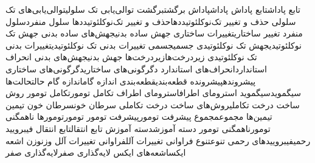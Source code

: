 {تابع پاداش}{تابع پاداش}
{پاداش}{پاداش}
{برگشت}{برگشت}
{توالی‌یابی تک سلولی}{توالی‌یابی‌های تک سلولی}
{حذف و تغییر تک‌نوکلئوتیددها}{حذف و تغییر تک‌نوکلئوتیددها}
{سلول منفرد}{سلول منفرد}
{تغییر ساختاری}{تغییرات ساختاری}
{جهش ساده بدنی}{جهش‌های ساده بدنی}
{جهش تک نوکلئوتیدی}{جهش تک نوکلئوتیدی}
{جسمی}{جسمی}
{تغییرات بدنی تک نوکلئوتیدی}{تغییرات بدنی تک نوکلئوتیدی}
{زیردرخت‌ها}{زیردرخت‌ها}
{جهش بدنی}{جهش‌های بدنی}
{انحراف استاندارد}{انحراف‌های استاندارد}
{دگرگونی‌های ساختاری}{دگرگونی‌های ساختاری}
{پیشرونده}{پیشرونده}
{قطعه‌‌بندی}{قطعه‌بندی}
{اندازه گام}{اندازه گام}
{حالت}{حالت‌ها}
{سیگموید}{سیگموید}
{استرومای اطراف}{استرومای اطراف}
{تکامل تومور}{تکامل تومور}
{روش ساخت درخت تکاملی}{روش‌های ساخت درخت تکاملی}
{سرطان خون}{سرطان خون}
{تیمین}{ تیمین‌ها}
{مجموع}{مجموع}
{پیشرفت تومور}{پیشرفت تومور}
{تومور}{تومورها}
{ناهمگنی تومور}{ناهمگنی تومور}
{دسته آموزش}{دسته آموزش}
{تابع انتقال}{تابع انتقال}
{فیبرویید رحمی}{فیبروییدهای رحمی}
{تنوع}{تنوع}
{فراوانی تغییرات آلل}{فراوانی تغییرات آلل}
{وزن}{وزن}
{اشعه ایکس}{اشعه‌های ایکس}
{لایه‌گذاری صفر}{لایه‌گذاری صفر}
